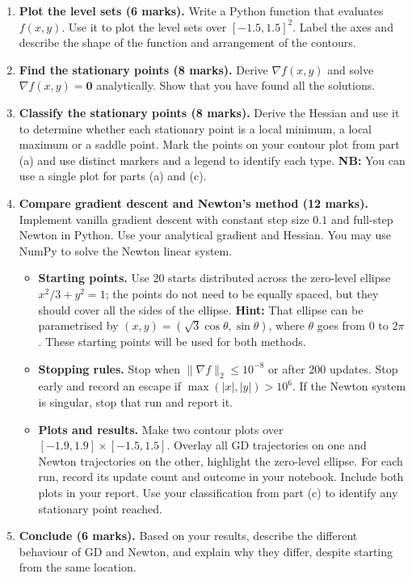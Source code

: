 \documentclass[10pt]{article}
\begin{document}
\begin{enumerate}[label=\textbf{(\alph*)}]
\item \textbf{Plot the level sets (6 marks).} Write a Python function that evaluates $f(x,y)$. Use it to plot the level sets over $[-1.5,1.5]^2$. Label the axes and describe the shape of the function and arrangement of the contours.

\item \textbf{Find the stationary points (8 marks).} Derive $\nabla f(x,y)$ and solve $\nabla f(x,y)=\mathbf{0}$ analytically. Show that you have found all the solutions.

\item \textbf{Classify the stationary points (8 marks).} Derive the Hessian and use it to determine whether each stationary point is a local minimum, a local maximum or a saddle point. Mark the points on your contour plot from part (a) and use distinct markers and a legend to identify each type. \textbf{NB:} You can use a single plot for parts (a) and (c).  

\item \textbf{Compare gradient descent and Newton's method (12 marks).} Implement vanilla gradient descent with constant step size $0.1$ and full-step Newton in Python. Use your analytical gradient and Hessian. You may use NumPy to solve the Newton linear system.

\begin{itemize}
\item \textbf{Starting points.} Use 20 starts distributed across the zero-level ellipse $x^2/3+y^2=1$; the points do not need to be equally spaced, but they should cover all the sides of the ellipse. \textbf{Hint:} That ellipse can be parametrised by $(x,y)=(\sqrt{3}\cos\theta,\sin\theta)$, where $\theta$ goes from $0$ to $2\pi$. These starting points will be used for both methods.

\item \textbf{Stopping rules.} Stop when $\|\nabla f\|_2\leq 10^{-8}$ or after 200 updates. Stop early and record an escape if $\max(|x|,|y|)>10^6$. If the Newton system is singular, stop that run and report it.

\item \textbf{Plots and results.} Make two contour plots over $[-1.9,1.9]\times[-1.5,1.5]$. Overlay all GD trajectories on one and Newton trajectories on the other, highlight the zero-level ellipse. For each run, record its update count and outcome in your notebook. Include both plots in your report. Use your classification from part (c) to identify any stationary point reached.
\end{itemize}

\item \textbf{Conclude (6 marks).} Based on your results, describe the different behaviour of GD and Newton, and explain why they differ, despite starting from the same location. 

\end{enumerate}
\end{document}
